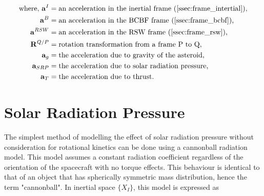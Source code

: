 \begin{equation*}
    \begin{aligned}
        \textrm{where, }
        \mathbf{a}^I &= \textrm{an acceleration in the inertial frame (\autoref{ssec:frame_intertial}),}\\
        \mathbf{a}^B &= \textrm{an acceleration in the BCBF frame (\autoref{ssec:frame_bcbf}),}\\
        \mathbf{a}^{RSW} &= \textrm{an acceleration in the RSW frame (\autoref{ssec:frame_rsw}),}\\
        \mathbf{R}^{Q/P} &= \textrm{rotation transformation from a frame P to Q,}\\
        \mathbf{a}_g &= \textrm{the acceleration due to gravity of the asteroid,}\\
        \mathbf{a}_{SRP} &= \textrm{the acceleration due to solar radiation pressure,}\\
        \mathbf{a}_T &= \textrm{the acceleration due to thrust.}\\
    \end{aligned}
\end{equation*}


% 





\section{Solar Radiation Pressure}

The simplest method of modelling the effect of solar radiation pressure without
consideration for rotational kinetics can be done using a cannonball radiation
model. This model assumes a constant radiation coefficient regardless of the
orientation of the spacecraft with no torque effects. This behaviour is
identical to that of an object that has spherically symmetric mass distribution,
hence the term "cannonball". In inertial space $\{X_I\}$, this model is
expressed as

